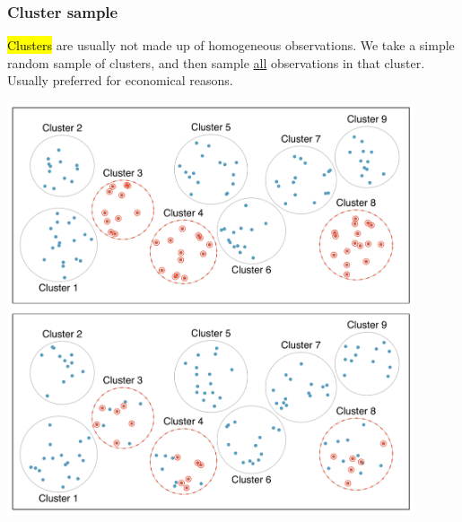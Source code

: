 \begin{frame}
\frametitle{Cluster sample}

\hl{Clusters} are usually not made up of homogeneous observations. We take a simple random sample of clusters, and then sample \underline{all} observations in that cluster. Usually preferred for economical reasons.

\begin{center}
\includegraphics[width=0.9\textwidth]{1-4_obs_studies_sampling/figures/sampling_methods/cluster}
\end{center}

\end{frame}



